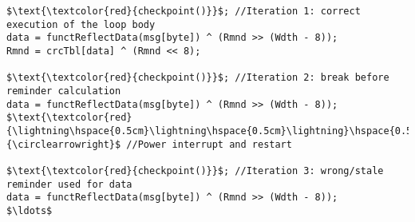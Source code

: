 \documentclass[border={20pt 5pt 25pt 10pt}]{standalone} %
\begin{document}
	

\begin{lstlisting}[style = mystyle]
$\text{\textcolor{red}{checkpoint()}}$; //Iteration 1: correct execution of the loop body
data = functReflectData(msg[byte]) ^ (Rmnd >> (Wdth - 8));
Rmnd = crcTbl[data] ^ (Rmnd << 8);

$\text{\textcolor{red}{checkpoint()}}$; //Iteration 2: break before reminder calculation
data = functReflectData(msg[byte]) ^ (Rmnd >> (Wdth - 8));
$\text{\textcolor{red}{\lightning\hspace{0.5cm}\lightning\hspace{0.5cm}\lightning}\hspace{0.5cm}}\textcolor{red}{\circlearrowright}$ //Power interrupt and restart

$\text{\textcolor{red}{checkpoint()}}$; //Iteration 3: wrong/stale reminder used for data
data = functReflectData(msg[byte]) ^ (Rmnd >> (Wdth - 8));
$\ldots$
\end{lstlisting} 
\end{document}
